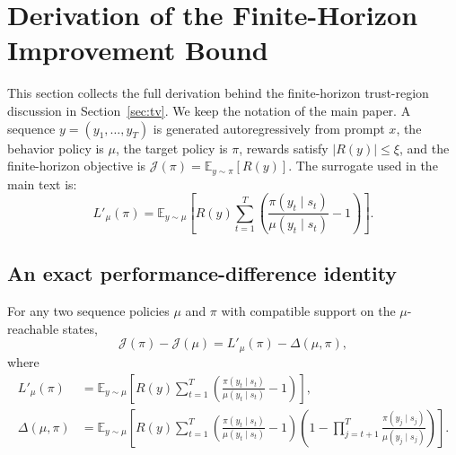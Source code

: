 \section{Derivation of the Finite-Horizon Improvement Bound}
\label{app:improvement-bound}

This section collects the full derivation behind the finite-horizon trust-region discussion in Section~\ref{sec:tv}. We keep the notation of the main paper. A sequence $y=(y_1,\dots,y_T)$ is generated autoregressively from prompt $x$, the behavior policy is $\mu$, the target policy is $\pi$, rewards satisfy $|R(y)|\le\xi$, and the finite-horizon objective is $\mathcal J(\pi)=\mathbb E_{y\sim\pi}[R(y)]$. The surrogate used in the main text is:
\begin{equation}
L'_{\mu}(\pi)=\mathbb E_{y\sim\mu}\left[R(y)\sum_{t=1}^{T}\left(\frac{\pi(y_t\mid s_t)}{\mu(y_t\mid s_t)}-1\right)\right].
\label{eq:app-surrogate}
\end{equation}

\subsection{An exact performance-difference identity}
\label{app:exact-identity}

\begin{lemma}
\label{lem:app-identity}
For any two sequence policies $\mu$ and $\pi$ with compatible support on the $\mu$-reachable states,
\begin{equation}
\mathcal J(\pi)-\mathcal J(\mu)
= L'_{\mu}(\pi)-\Delta(\mu,\pi),
\label{eq:app-identity}
\end{equation}
where
\begin{align}
L'_{\mu}(\pi)
&= \mathbb E_{y\sim\mu}\left[R(y)\sum_{t=1}^{T}\left(\frac{\pi(y_t\mid s_t)}{\mu(y_t\mid s_t)}-1\right)\right],
\label{eq:app-identity-surrogate}\\
\Delta(\mu,\pi)
&= \mathbb E_{y\sim\mu}\left[R(y)\sum_{t=1}^{T}\left(\frac{\pi(y_t\mid s_t)}{\mu(y_t\mid s_t)}-1\right)\left(1-\prod_{j=t+1}^{T}\frac{\pi(y_j\mid s_j)}{\mu(y_j\mid s_j)}\right)\right].
\label{eq:app-delta}
\end{align}
\end{lemma}


